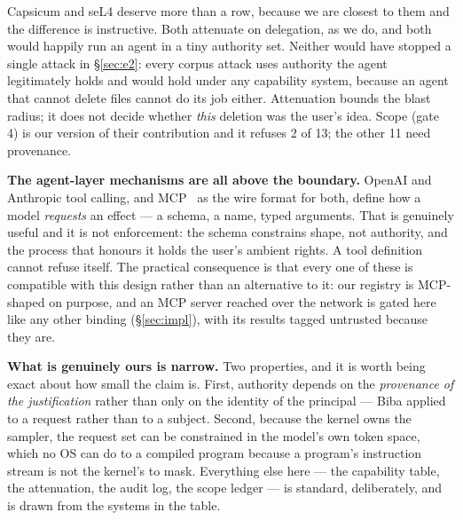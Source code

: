 \documentclass[11pt]{article}
\begin{document}
Capsicum and seL4 deserve more than a row, because we are closest to them and
the difference is instructive. Both attenuate on delegation, as we do, and both
would happily run an agent in a tiny authority set. Neither would have stopped a
single attack in \S\ref{sec:e2}: every corpus attack uses authority the agent
legitimately holds and would hold under any capability system, because an agent
that cannot delete files cannot do its job either. Attenuation bounds the blast
radius; it does not decide whether \emph{this} deletion was the user's idea.
Scope (gate 4) is our version of their contribution and it refuses 2 of 13; the
other 11 need provenance.

\textbf{The agent-layer mechanisms are all above the boundary.} OpenAI and
Anthropic tool calling, and MCP~\cite{mcp2024} as the wire format for
both, define how a model \emph{requests} an effect --- a schema, a name, typed
arguments. That is genuinely useful and it is not enforcement: the schema
constrains shape, not authority, and the process that honours it holds the
user's ambient rights. A tool definition cannot refuse itself. The practical
consequence is that every one of these is compatible with this design rather
than an alternative to it: our registry is MCP-shaped on purpose, and an MCP
server reached over the network is gated here like any other binding
(\S\ref{sec:impl}), with its results tagged untrusted because they are.

\textbf{What is genuinely ours is narrow.} Two properties, and it is worth being
exact about how small the claim is. First, authority depends on the
\emph{provenance of the justification} rather than only on the identity of the
principal --- Biba applied to a request rather than to a subject. Second, because
the kernel owns the sampler, the request set can be constrained in the model's
own token space, which no OS can do to a compiled program because a program's
instruction stream is not the kernel's to mask. Everything else here --- the
capability table, the attenuation, the audit log, the scope ledger --- is
standard, deliberately, and is drawn from the systems in the table.
\end{document}
